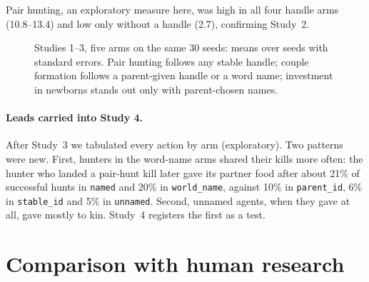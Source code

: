 \documentclass[11pt]{article}
\newcommand{\arm}[1]{\texttt{#1}}
\begin{document}
Pair hunting, an exploratory measure here, was high in all four handle arms (10.8--13.4) and low
only without a handle (2.7), confirming Study~2.

\begin{figure}[t]
\centering
{}
\caption{Studies 1--3, five arms on the same 30 seeds: means over seeds with standard errors.
Pair hunting follows any stable handle; couple formation follows a parent-given handle or a word
name; investment in newborns stands out only with parent-chosen names.}
\label{fig:early}
\end{figure}

\paragraph{Leads carried into Study 4.} After Study~3 we tabulated every action by arm
(exploratory). Two patterns were new. First, hunters in the word-name arms shared their kills
more often: the hunter who landed a pair-hunt kill later gave its partner food after about 21\%
of successful hunts in \arm{named} and 20\% in \arm{world\_name}, against 10\% in
\arm{parent\_id}, 6\% in \arm{stable\_id} and 5\% in \arm{unnamed}. Second, unnamed agents,
when they gave at all, gave mostly to kin. Study~4 registers the first as a test.

\FloatBarrier


\section{Comparison with human research}
\label{sec:human}
\end{document}
